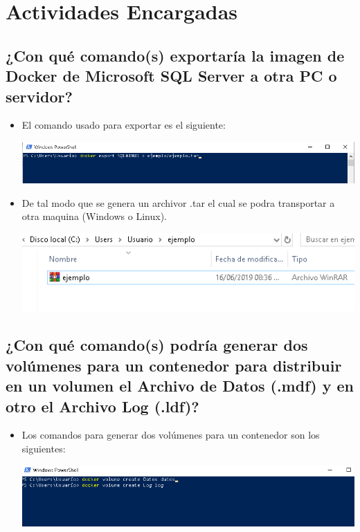 \section{Actividades Encargadas} 

\subsection {¿Con qué comando(s) exportaría la imagen de Docker de Microsoft SQL Server a otra PC o servidor?}
\begin{itemize}
	\item El comando usado para exportar es el siguiente:
	
	\begin{center}
	\includegraphics[width=17cm]{./Imagenes/Actividad1} 
	\end{center}

\item De tal modo que se genera un archivor .tar el cual se podra transportar a otra maquina (Windows o Linux).
	\begin{center}
	\includegraphics[width=15cm]{./Imagenes/Actividad2} 
	\end{center}
\end{itemize} 
\subsection {¿Con qué comando(s) podría generar dos volúmenes para un contenedor para distribuir en un volumen el Archivo
de Datos (.mdf) y en otro el Archivo Log (.ldf)?}
\begin{itemize}
\item Los comandos para generar dos volúmenes para un contenedor son los siguientes:
\begin{center}
	\includegraphics[width=15cm]{./Imagenes/Actividad3} 
	\end{center}
\end{itemize} 

